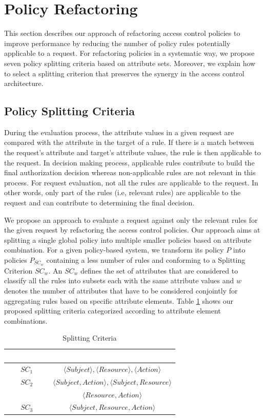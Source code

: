 \section{Policy Refactoring} \label{sec:approach}
This section describes our approach of refactoring access control policies to improve performance by reducing the number of policy 
rules potentially applicable to a request. For refactoring policies in a systematic way, we propose seven policy splitting 
criteria based on attribute sets. 
Moreover, we explain how to select a splitting criterion that preserves the synergy in the access control architecture.

\subsection{Policy Splitting Criteria} \label{subsec:SplittingCriteria}
During the evaluation process, the attribute values in a given request are compared with the attribute in the target of a rule. 
If there is a match between the request's attribute and target's attribute values, the rule is then applicable to the request.
In decision making process, applicable rules contribute
to build the final authorization decision whereas non-applicable rules are not relevant in this process. 
For request evaluation, not all the rules are applicable to the request. In other words, only part of the rules (i.e, relevant rules) are
 applicable to the request and can contribute to determining the final decision.

We propose an approach to evaluate a request against only the relevant rules for the given request by refactoring the access control policies. Our approach aims at splitting a single global policy into 
multiple smaller policies based on attribute combination. For a given policy-based system, we transform its policy \normalsize $P$ into 
policies \normalsize $P_{SC_{w}}$ containing a less number of rules and conforming to a Splitting Criterion $SC_{w}$. 
An $SC_{w}$ defines the set of attributes that are considered to classify all the rules into subsets each with the same attribute values and $w$ denotes 
the number of attributes that have to be considered conjointly for aggregating rules based on specific attribute elements. Table \ref{table1} shows our proposed splitting criteria categorized according to attribute element combinations.
\begin{table}[h!]
\centering
\setlength{\extrarowheight}{6 pt}
\begin{tabular}{|>{\small}c|>{\small}c|}
\hline \rowcolor{black}
\bf
\textcolor{white}{Categories}& \bf \textcolor{white}{Splitting Criteria}\\ \hline
$SC_{1}$& {$\langle Subject \rangle, \langle Resource\rangle, \langle Action\rangle$}\\ \hline
$SC_{2}$& {$\langle Subject,Action \rangle, \langle Subject,Resource\rangle$}\\&{$\langle Resource,Action\rangle$}\\ \hline
$SC_{3}$& {$\langle Subject,Resource,Action\rangle$}\\ \hline
\end{tabular}
\caption{Splitting Criteria}
\label{table1}\end{table}

